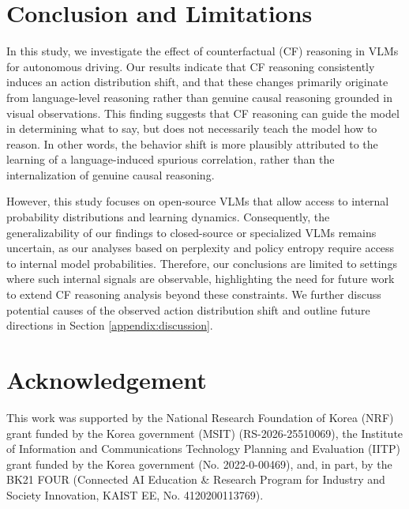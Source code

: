 \documentclass{article}
\begin{document}
\section{Conclusion and Limitations}
\label{sec:conclusion}
In this study, we investigate the effect of counterfactual (CF) reasoning in VLMs for autonomous driving. Our results indicate that CF reasoning consistently induces an action distribution shift, and that these changes primarily originate from language-level reasoning rather than genuine causal reasoning grounded in visual observations. This finding suggests that CF reasoning can guide the model in determining what to say, but does not necessarily teach the model how to reason. In other words, the behavior shift is more plausibly attributed to the learning of a language-induced spurious correlation, rather than the internalization of genuine causal reasoning.

However, this study focuses on open-source VLMs that allow access to internal probability distributions and learning dynamics. Consequently, the generalizability of our findings to closed-source or specialized VLMs \cite{causal:e2e-vlm:alpamayo, causal:cf_vla} remains uncertain, as our analyses based on perplexity and policy entropy require access to internal model probabilities. Therefore, our conclusions are limited to settings where such internal signals are observable, highlighting the need for future work to extend CF reasoning analysis beyond these constraints. We further discuss potential causes of the observed action distribution shift and outline future directions in Section \ref{appendix:discussion}.

\section{Acknowledgement}
This work was supported by the National Research Foundation of Korea (NRF) grant funded by the Korea government (MSIT) (RS-2026-25510069), the Institute of Information and Communications Technology Planning and Evaluation (IITP) grant funded by the Korea government (No. 2022-0-00469), and, in part, by the BK21 FOUR (Connected AI Education \& Research Program for Industry and Society Innovation, KAIST EE, No. 4120200113769).

\clearpage

%  




\end{document}
